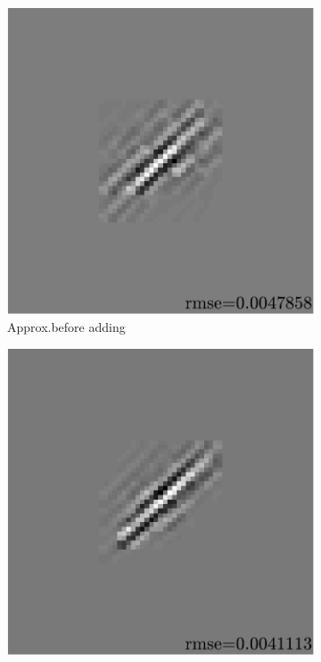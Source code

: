 \begin{figure}[!ht]
\begin{subfigure}[b]{0.32\linewidth}
\includegraphics[width=\linewidth]{figures/before_after/xp_128x128_sc2_angl1_K3_S3_node4before_approx.pdf}
\caption{Approx.\@ before adding}\label{fig_beforeafter-approx_before}
\end{subfigure}
\begin{subfigure}[b]{0.32\linewidth}\centering
\includegraphics[width=\linewidth]{figures/before_after/xp_128x128_sc2_angl1_K3_S3_node4after_approx.pdf}

\end{subfigure}
\end{figure}
